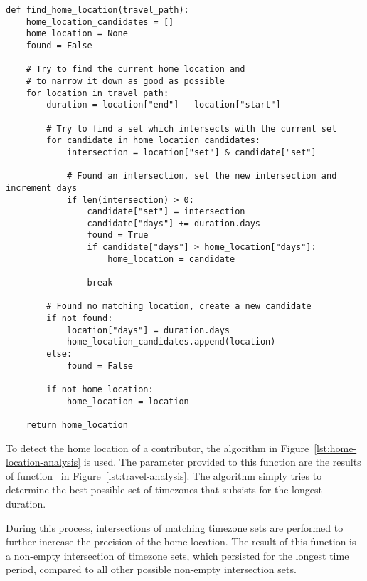 \begin{verbatim}
def find_home_location(travel_path):
    home_location_candidates = []
    home_location = None
    found = False

    # Try to find the current home location and
    # to narrow it down as good as possible
    for location in travel_path:
        duration = location["end"] - location["start"]

        # Try to find a set which intersects with the current set
        for candidate in home_location_candidates:
            intersection = location["set"] & candidate["set"]

            # Found an intersection, set the new intersection and increment days
            if len(intersection) > 0:
                candidate["set"] = intersection
                candidate["days"] += duration.days
                found = True
                if candidate["days"] > home_location["days"]:
                    home_location = candidate

                break

        # Found no matching location, create a new candidate
        if not found:
            location["days"] = duration.days
            home_location_candidates.append(location)
        else:
            found = False

        if not home_location:
            home_location = location

    return home_location
\end{verbatim}
\begingroup
{}\label{lst:home-location-analysis}
\endgroup

To detect the home location of a contributor, the algorithm in Figure~\ref{lst:home-location-analysis} is used.
The parameter provided to this function are the results of function~ in Figure~\ref{lst:travel-analysis}.
The algorithm simply tries to determine the best possible set of timezones that subsists for the longest duration.

During this process, intersections of matching timezone sets are performed to further increase the precision of the home location.
The result of this function is a non-empty intersection of timezone sets, which persisted for the longest time period, compared to all other possible non-empty intersection sets.
